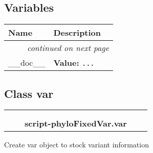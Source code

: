 
  \subsection{Variables}

    \vspace{-1cm}
\hspace{\varindent}\begin{longtable}{|p{\varnamewidth}|p{\vardescrwidth}|l}
\cline{1-2}
\cline{1-2} \centering \textbf{Name} & \centering \textbf{Description}& \\
\cline{1-2}
\endhead\cline{1-2}\multicolumn{3}{r}{\small\textit{continued on next page}}\\\endfoot\cline{1-2}
\endlastfoot\raggedright \_\-\_\-d\-o\-c\-\_\-\_\- & \raggedright \textbf{Value:} 
{\tt \texttt{...}}&\\
\cline{1-2}
\end{longtable}



\subsection{Class var}

    \label{script-phyloFixedVar:var}
\begin{tabular}{cccccc}
\multicolumn{2}{r}{\settowidth{\BCL}{object}\multirow{2}{\BCL}{object}}
&&
  \\\cline{3-3}
  &&\multicolumn{1}{c|}{}
&&
  \\
&&\multicolumn{2}{l}{\textbf{script-phyloFixedVar.var}}
\end{tabular}

Create var object to stock variant information



